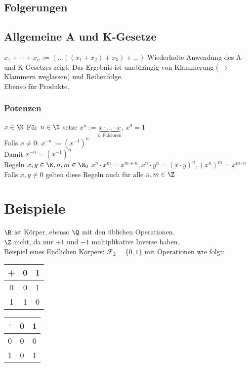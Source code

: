 %
\subsection{Folgerungen}
\subsection*{Allgemeine A und K-Gesetze}
$x_1 + \cdots + x_n := (...((x_1 + x_2) + x_3) + ...)$
Wiederholte Anwendung des A- und K-Gesetzes zeigt: Das Ergebnis ist unabhängig von Klammerung ($\to$ Klammern weglassen) und Reihenfolge.\\
Ebenso für Produkte.\\
\subsubsection*{Potenzen}
$x\in \K$ Für $n \in \N$ setze $x^n := \underbrace{x\cdot ... \cdot x}_{\text{n Faktoren}}$, $x^0 = 1$\\
Falls $x \neq 0$: $x^{-n} := (x^{-1})^n$\\
Damit $x^{-n} = (x^{-1})^n$\\
Regeln $x,y \in \K, n, m \in \N_0$
$x^n\cdot x^m = x^{m+n}, x^n\cdot y^n = (x\cdot y)^n, (x^n)^m = x^{m\cdot n}$\\
Falls $x,y \neq 0$ gelten diese Regeln auch für alle $n, m \in \Z$
\section*{Beispiele}
$\R$ ist Körper, ebenso $\Q$ mit den üblichen Operationen.\\
$\Z$ nicht, da nur $+1$ und $-1$ multiplikative Inverse haben.\\
Beispiel eines Endlichen Körpers:
$\mathcal{F}_2 = \{0,1\}$ mit Operationen wie folgt:\\
\begin{tabular}{c|c|c}
+ & 0 & 1\\\hline
0 & 0 & 1\\
1 & 1 & 0
\end{tabular}
\begin{tabular}{c|c|c}
$\cdot$ & 0 & 1\\\hline
0 & 0 & 0\\
1 & 0 & 1
\end{tabular}
